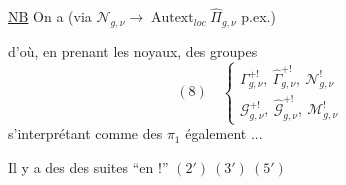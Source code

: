 \uline{NB} On a (via $\mathcal N_{g,\nu}\to\operatorname{Autext}_{loc}\widehat\Pi_{g,\nu}$ p.ex.)

d'où, en prenant les noyaux, des groupes
\[
(8)\quad\left\{\begin{array}{l}
\Gamma^{+!}_{g,\nu},\ \widehat\Gamma^{+!}_{g,\nu},\ \mathcal N^!_{g,\nu}\\
\mathcal G^{+!}_{g,\nu},\ \widehat{\mathcal G}^{+!}_{g,\nu},\ \mathcal M^!_{g,\nu}
\end{array}\right.
\]
s'interprétant comme des $\pi_1$ également ...

Il y a des des suites ``en $!$''
 $(2')\ (3')\ (5')$

